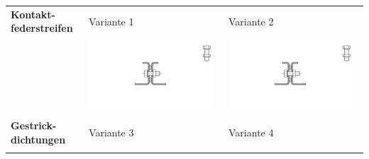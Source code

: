 \begin{longtable}{l p{6.55cm} p{6.55cm}}
         \begin{minipage}{2cm}\vspace*{5pt}\textbf{Kontakt-federstreifen}\end{minipage} & Variante 1 & Variante 2 \\ \nopagebreak
          & \noindent\begin{minipage}{6.5cm}
                \includegraphics[page=9, width=0.95\textwidth, trim = 12.5cm 7.5cm 9.5cm 6.5cm, clip]{Abbildungen/Kapitel3/Konzepte.pdf}
        \end{minipage} &
        \noindent\begin{minipage}{6.5cm}
                \includegraphics[page=10, width=0.95\textwidth, trim = 12.5cm 9cm 12cm 5cm, clip]{Abbildungen/Kapitel3/Konzepte.pdf}
        \end{minipage} \\
        & & \\
    \midrule
         \begin{minipage}{2cm}\vspace*{5pt}\textbf{Gestrick-dichtungen}\end{minipage} & Variante 3 & Variante 4 \\ \nopagebreak 

\end{longtable}
